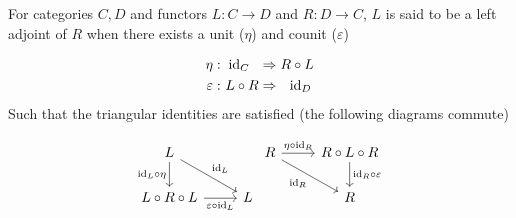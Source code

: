 \begin{definition}\label{def:adjoint_unit_counit}
  For categories $C,D$ and functors $L: C\to D$ and $R: D\to C$, $L$ is said to
  be a left adjoint of $R$ when there exists a unit ($\eta$) and counit
  ($\varepsilon$)

  \[
    \begin{aligned}
      \eta&:\\
      \varepsilon&:
    \end{aligned}
    \ \begin{aligned}
      \mathrm{id}_C\ \ &\Rightarrow R \circ L\\
      L \circ R &\Rightarrow\ \ \mathrm{id}_D
    \end{aligned}
  \]
  Such that the triangular identities are satisfied (the following diagrams
  commute)

  \[\begin{tikzcd} L \\
    {L\circ R\circ L} & L
    \arrow["{\id_L\circ\eta}"', from=1-1, to=2-1]
    \arrow["{\varepsilon\circ \id_L}"', from=2-1, to=2-2]
    \arrow["{\id_L}", from=1-1, to=2-2]
  \end{tikzcd}
  \begin{tikzcd}
    R & {R\circ L\circ R} \\
    & R
    \arrow["{\eta\circ\id_R}", from=1-1, to=1-2]
    \arrow["{\id_R \circ \varepsilon}", from=1-2, to=2-2]
    \arrow["{\id_R}"', from=1-1, to=2-2]
  \end{tikzcd}\]
\end{definition}

